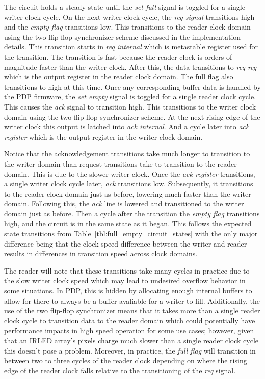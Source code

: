 The circuit holds a steady state until the {\it set full} signal is toggled for a single writer clock cycle. On the next writer clock cycle, the {\it req signal} transitions high and the {\it empty flag} transitions low. This transitions to the reader clock domain using the two flip-flop synchronizer scheme discussed in the implementation details. This transition starts in {\it req internal} which is metastable register used for the transition. The transition is fast because the reader clock is orders of magnitude faster than the writer clock. After this, the data transitions to {\it req reg} which is the output register in the reader clock domain. The full flag also transitions to high at this time. Once any corresponding buffer data is handled by the PDP firmware, the {\it set empty} signal is toggled for a single reader clock cycle. This causes the {\it ack} signal to transition high. This transitions to the writer clock domain using the two flip-flop synchronizer scheme. At the next rising edge of the writer clock this output is latched into {\it ack internal}. And a cycle later into {\it ack register} which is the output register in the writer clock domain.

Notice that the acknowledgement transitions take much longer to transition to the writer domain than request transitions take to transition to the reader domain. This is due to the slower writer clock. Once the {\it ack register} transitions, a single writer clock cycle later, {\it ack} transitions low. Subsequently, it transitions to the reader clock domain just as before, lowering much faster than the writer domain. Following this, the {\it ack} line is lowered and transitioned to the writer domain just as before. Then a cycle after the transition the {\it empty flag} transitions high, and the circuit is in the same state as it began. This follows the expected state transitions from Table~\ref{tbl:full_empty_circuit_states} with the only major difference being that the clock speed difference between the writer and reader results in differences in transition speed across clock domains.

The reader will note that these transitions take many cycles in practice due to the slow writer clock speed which may lead to undesired overflow behavior in some situations. In PDP, this is hidden by allocating enough internal buffers to allow for there to always be a buffer avaliable for a writer to fill. Additionally, the use of the two flip-flop synchronizer means that it takes more than a single reader clock cycle to transition data to the reader domain which could potentially have performance impacts in high speed operation for some use cases; however, given that an IRLED array's pixels charge much slower than a single reader clock cycle this doesn't pose a problem. Moreover, in practice, the {\it full flag} will transition in between two to three cycles of the reader clock depending on where the rising edge of the reader clock falls relative to the transitioning of the {\it req} signal.

